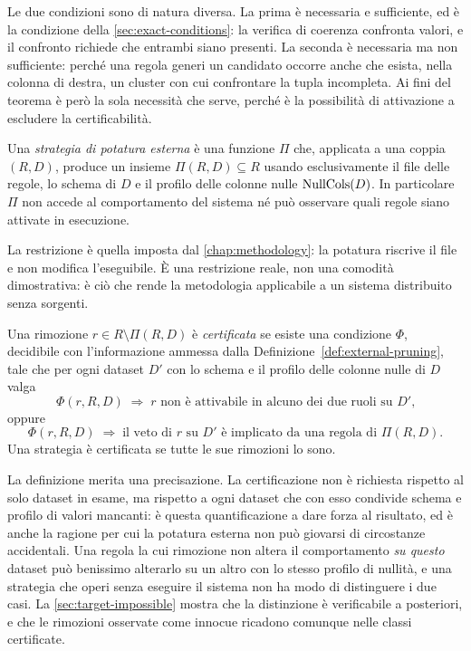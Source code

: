 Le due condizioni sono di natura diversa. La prima è necessaria e sufficiente, ed è la condizione
\Vone{} della \autoref{sec:exact-conditions}: la verifica di coerenza confronta valori, e il
confronto richiede che entrambi siano presenti. La seconda è necessaria ma non sufficiente: perché
una regola generi un candidato occorre anche che esista, nella colonna di destra, un cluster con
cui confrontare la tupla incompleta. Ai fini del teorema è però la sola necessità che serve,
perché è la possibilità di attivazione a escludere la certificabilità.

\begin{definition}\label{def:external-pruning}
Una \emph{strategia di potatura esterna} è una funzione $\Pi$ che, applicata a una coppia
$(R, D)$, produce un insieme $\Pi(R, D) \subseteq R$ usando esclusivamente il file delle regole,
lo schema di $D$ e il profilo delle colonne nulle $\mathrm{NullCols}(D)$. In particolare $\Pi$ non accede
al comportamento del sistema né può osservare quali regole siano attivate in esecuzione.
\end{definition}

La restrizione è quella imposta dal \autoref{chap:methodology}: la potatura riscrive il file e non
modifica l'eseguibile. È una restrizione reale, non una comodità dimostrativa: è ciò che rende la
metodologia applicabile a un sistema distribuito senza sorgenti.

\begin{definition}\label{def:certified}
Una rimozione $r \in R \setminus \Pi(R, D)$ è \emph{certificata} se esiste una condizione $\Phi$,
decidibile con l'informazione ammessa dalla Definizione~\ref{def:external-pruning}, tale che per
ogni dataset $D'$ con lo schema e il profilo delle colonne nulle di $D$ valga
\[
    \Phi(r, R, D) \;\Longrightarrow\; \text{$r$ non è attivabile in alcuno dei due ruoli su $D'$,}
\]
oppure
\[
    \Phi(r, R, D) \;\Longrightarrow\; \text{il veto di $r$ su $D'$ è implicato da una regola di
    $\Pi(R, D)$.}
\]
Una strategia è certificata se tutte le sue rimozioni lo sono.
\end{definition}

La definizione merita una precisazione. La certificazione non è richiesta rispetto al solo dataset
in esame, ma rispetto a ogni dataset che con esso condivide schema e profilo di valori mancanti: è
questa quantificazione a dare forza al risultato, ed è anche la ragione per cui la potatura
esterna non può giovarsi di circostanze accidentali. Una regola la cui rimozione non altera il
comportamento \emph{su questo} dataset può benissimo alterarlo su un altro con lo stesso profilo di
nullità, e una strategia che operi senza eseguire il sistema non ha modo di distinguere i due
casi. La \autoref{sec:target-impossible} mostra che la distinzione è verificabile a posteriori, e
che le rimozioni osservate come innocue ricadono comunque nelle classi certificate.


